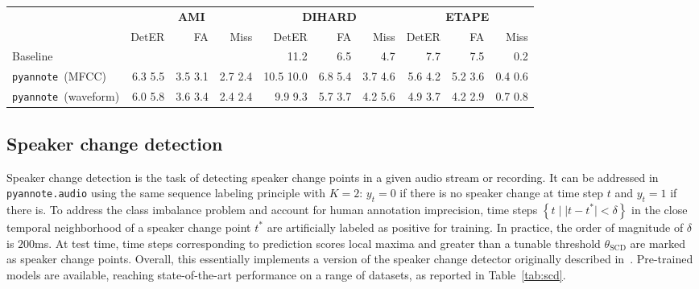 \documentclass{article}
\def\pyannote{{\small\texttt{pyannote}}}
\begin{document}
\begin{table*}[htb]
    \centering
    \begin{tabular}{|l|r|rr|r|rr|r|rr|}
        \hline
            & \multicolumn{3}{c|}{\textbf{AMI}} & \multicolumn{3}{c|}{\textbf{DIHARD}} & \multicolumn{3}{c|}{\textbf{ETAPE}}\\
            & DetER & FA & Miss & DetER & FA & Miss & DetER & FA & Miss \\
        \hline
        Baseline & & & & 11.2 \cite{Diez2019, dihard} &  6.5 & 4.7 &  7.7 \cite{S4D} & 7.5 & 0.2 \\
        \hline
        \pyannote~(MFCC)~\cite{Gelly2018} & 6.3 \scriptsize{5.5} & 3.5 \scriptsize{3.1} & 2.7 \scriptsize{2.4} & 10.5 \scriptsize{10.0} & 6.8 \scriptsize{5.4} & 3.7 \scriptsize{4.6} & 5.6 \scriptsize{4.2} & 5.2 \scriptsize{3.6} & 0.4 \scriptsize{0.6} \\
        \pyannote~(waveform) & 6.0 \scriptsize{5.8} & 3.6 \scriptsize{3.4} & 2.4 \scriptsize{2.4} & 9.9 \scriptsize{9.3} & 5.7 \scriptsize{3.7} & 4.2 \scriptsize{5.6} & 4.9 \scriptsize{3.7} & 4.2 \scriptsize{2.9} & 0.7 \scriptsize{0.8}\\
        \hline

    \end{tabular}
    \caption{Evaluation of pre-trained voice activity detection models, in terms of detection error (DetER \%), false alarm (FA \%), and missed detection (Miss \%) rates. Results on the development set are reported using small font size.  We report two {\small{\texttt{pyannote.audio}}} variants: the first one is based on handcrafted features (MFCCs) and the other one is an end-to-end model processing the waveform directly.
\emph{Baseline} corresponds to the best result we could find in the literature as of October 2019.}
    \label{tab:vad}
\end{table*}

\vspace{-0.17cm}
\subsection{Speaker change detection}

Speaker change detection is the task of detecting speaker change points in a given audio stream or recording. It can be addressed in {\small\texttt{pyannote.audio}} using the same sequence labeling principle with $K=2$: $y_{t} = 0$ if there is no speaker change at time step $t$ and $y_t = 1$ if there is. To address the class imbalance problem and account for human annotation imprecision, time steps $\left\{t \;| \; |t - t^*| < \delta\right\}$ in the close temporal neighborhood of a speaker change point $t^*$ are artificially labeled as positive for training. In practice, the order of magnitude of $\delta$ is $200$ms. At test time, time steps corresponding to prediction scores local maxima and greater than a tunable threshold $\theta_{\text{SCD}}$ are marked as speaker change points. Overall, this essentially implements a version of the speaker change detector originally described in~\cite{Yin2017}. Pre-trained models are available, reaching state-of-the-art performance on a range of datasets, as reported in Table~\ref{tab:scd}.
\end{document}
